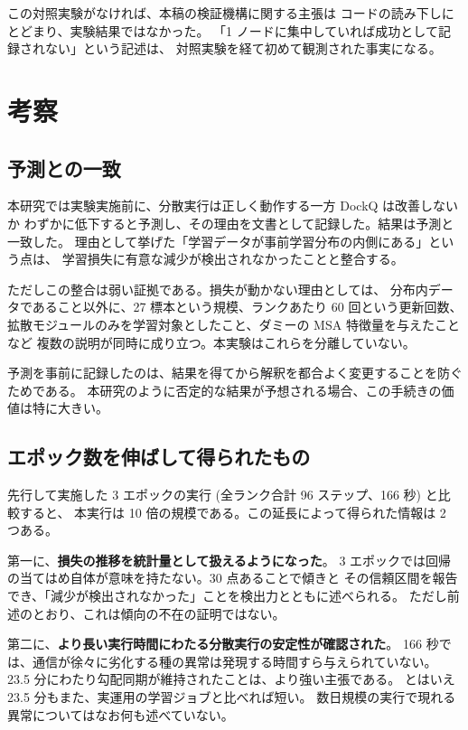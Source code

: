 \documentclass[11pt,a4paper]{article}
\begin{document}
この対照実験がなければ、本稿の検証機構に関する主張は
コードの読み下しにとどまり、実験結果ではなかった。
「1 ノードに集中していれば成功として記録されない」という記述は、
対照実験を経て初めて観測された事実になる。

\section{考察}

\subsection{予測との一致}

本研究では実験実施前に、分散実行は正しく動作する一方 DockQ は改善しないか
わずかに低下すると予測し、その理由を文書として記録した。結果は予測と一致した。
理由として挙げた「学習データが事前学習分布の内側にある」という点は、
学習損失に有意な減少が検出されなかったことと整合する。

ただしこの整合は弱い証拠である。損失が動かない理由としては、
分布内データであること以外に、27 標本という規模、ランクあたり 60 回という更新回数、
拡散モジュールのみを学習対象としたこと、ダミーの MSA 特徴量を与えたことなど
複数の説明が同時に成り立つ。本実験はこれらを分離していない。

予測を事前に記録したのは、結果を得てから解釈を都合よく変更することを防ぐためである。
本研究のように否定的な結果が予想される場合、この手続きの価値は特に大きい。

\subsection{エポック数を伸ばして得られたもの}

先行して実施した 3 エポックの実行 (全ランク合計 96 ステップ、166 秒) と比較すると、
本実行は 10 倍の規模である。この延長によって得られた情報は 2 つある。

第一に、\textbf{損失の推移を統計量として扱えるようになった}。
3 エポックでは回帰の当てはめ自体が意味を持たない。30 点あることで傾きと
その信頼区間を報告でき、「減少が検出されなかった」ことを検出力とともに述べられる。
ただし前述のとおり、これは傾向の不在の証明ではない。

第二に、\textbf{より長い実行時間にわたる分散実行の安定性が確認された}。
166 秒では、通信が徐々に劣化する種の異常は発現する時間すら与えられていない。
23.5 分にわたり勾配同期が維持されたことは、より強い主張である。
とはいえ 23.5 分もまた、実運用の学習ジョブと比べれば短い。
数日規模の実行で現れる異常についてはなお何も述べていない。
\end{document}
